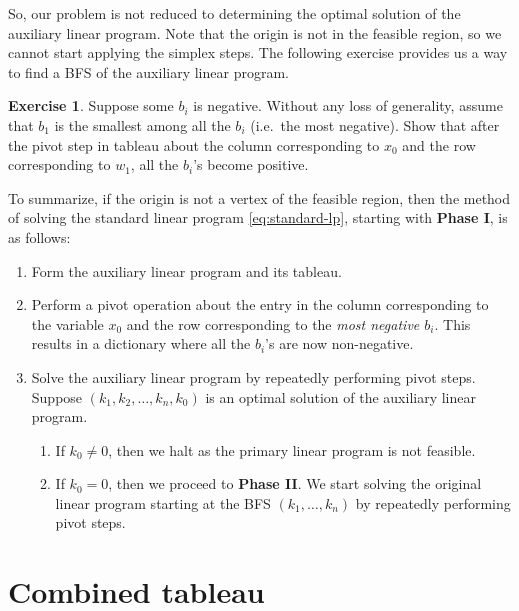 \documentclass[
]{book}
\providecommand{\tightlist}{%
  \setlength{\itemsep}{0pt}\setlength{\parskip}{0pt}}
\theoremstyle{definition}
\theoremstyle{definition}
\theoremstyle{definition}
\newtheorem{exercise}{Exercise}[chapter]
\theoremstyle{definition}
\theoremstyle{remark}
\begin{document}
So, our problem is not reduced to determining the optimal solution of the auxiliary linear program.
Note that the origin is not in the feasible region, so we cannot start applying the simplex steps.
The following exercise provides us a way to find a BFS of the auxiliary linear program.

\begin{exercise}
Suppose some \(b_i\) is negative.
Without any loss of generality, assume that \(b_1\) is the smallest among all the \(b_i\) (i.e.~the most negative).
Show that after the pivot step in tableau about the column corresponding to \(x_0\) and the row corresponding to \(w_1\), all the \(b_i\)'s become positive.
\end{exercise}

To summarize, if the origin is not a vertex of the feasible region, then the method of solving the standard linear program \eqref{eq:standard-lp}, starting with \textbf{Phase I}, is as follows:

\begin{enumerate}
\def\labelenumi{\arabic{enumi}.}
\tightlist
\item
  Form the auxiliary linear program and its tableau.
\item
  Perform a pivot operation about the entry in the column corresponding to the variable \(x_0\) and the row corresponding to the \emph{most negative \(b_i\)}. This results in a dictionary where all the \(b_i\)'s are now non-negative.
\item
  Solve the auxiliary linear program by repeatedly performing pivot steps.
  Suppose \((k_1, k_2, \dots, k_n, k_0)\) is an optimal solution of the auxiliary linear program.

  \begin{enumerate}
  \def\labelenumii{\arabic{enumii}.}
  \tightlist
  \item
    If \(k_0 \neq 0\), then we halt as the primary linear program is not feasible.
  \item
    If \(k_0 = 0\), then we proceed to \textbf{Phase II}. We start solving the original linear program starting at the BFS \((k_1, \dots, k_n)\) by repeatedly performing pivot steps.
  \end{enumerate}
\end{enumerate}

\hypertarget{combined-tableau}{%
\section{Combined tableau}\label{combined-tableau}}
\end{document}
